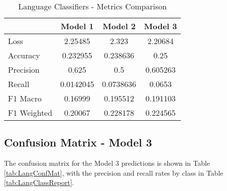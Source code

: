 \documentclass[11pt, letterpaper]{article}
\begin{document}
\begin{table}[h]
\begin{center}
\caption{Language Classifiers - Metrics Comparison}
\begin{tabular}{l c c c}
		&Model  1		& Model 2		&Model 3 \\ \hline
Loss		&2.25485		&2.323		&2.20684 \\
Accuracy	&0.232955	&0.238636	&0.25\\
Precision	&0.625		&0.5			&0.605263\\
Recall	&0.0142045	&0.0738636	&0.0653 \\ 

F1 Macro	&0.16999		&0.195512	&0.191103\\
F1 Weighted	&0.20067	&0.228178	&0.224565\\
\end{tabular}
\label{tab:LangMetricsSum} 
\end{center}
\end{table} 


\subsection{Confusion Matrix - Model 3}

The confusion matrix for the Model 3 predictions is shown in Table \ref{tab:LangConfMat}, with the precision and recall rates by class in Table \ref{tab:LangClassReport}. 
\end{document}

